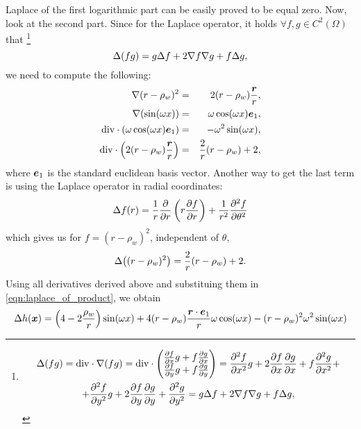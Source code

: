 Laplace of the first logarithmic part can be easily proved to be equal zero. 
Now, look at the second part. Since for the Laplace operator, it holds $\forall f,g\in C^2(\Omega)$ that
\footnote{
\begin{multline} \label{eqn:laplace_of_product_derivation}
  \Delta(fg) = {\rm div}\cdot\nabla(fg) = {\rm div}\cdot\begin{pmatrix} \frac{\partial f}{\partial x} g + f\frac{\partial g}{\partial x} \\ 
      \frac{\partial f}{\partial y} g + f\frac{\partial g}{\partial y}  \end{pmatrix} 
      = \frac{\partial^2 f}{\partial x^2} g + 2\frac{\partial f}{\partial x} \frac{\partial g}{\partial x}
        + f\frac{\partial^2 g}{\partial x^2} + \\
        + \frac{\partial^2 f}{\partial y^2}g + 2\frac{\partial f}{\partial y} \frac{\partial g}{\partial y}
        + \frac{\partial^2 g}{\partial y^2}
        = g\Delta{f} + 2\nabla f\nabla g + f\Delta{g}, \nonumber
\end{multline}
}
\begin{equation} \label{eqn:laplace_of_product}
  \Delta(fg) = g\Delta{f} + 2\nabla f\nabla g + f\Delta{g},
\end{equation}
we need to compute the following:
%
\begin{eqnarray*}
  \nabla (r-\rho_w)^2 &=& 2(r-\rho_w)\frac{\mathbf{\boldsymbol{r}}}{r}, \\
  \nabla (\sin(\omega x)) &=& \omega\cos(\omega x) \mathbf{\boldsymbol{e}}_1, \\
  {\rm div} \cdot\left(\omega\cos(\omega x) \mathbf{\boldsymbol{e}}_1\right) &=& -\omega^2\sin(\omega x),\\
  {\rm div}\cdot\left( 2(r-\rho_w)\frac{\mathbf{\boldsymbol{r}}}{r} \right) &=& \frac{2}{r}(r-\rho_w) + 2,
\end{eqnarray*}
where $\mathbf{\boldsymbol{e}}_1$ is the standard euclidean basis vector.
%
Another way to get the last term is using the Laplace operator in radial coordinates:
\begin{equation} \label{eqn:laplace_radial}
  \Delta f(r) = \frac{1}{r}\frac{\partial}{\partial r}\left( r \frac{\partial f}{\partial r}\right)
    + \frac{1}{r^2}\frac{\partial^2 f}{\partial \theta^2} \nonumber
\end{equation}
which gives us for $f=(r-\rho_w)^2$, independent of $\theta$,
\begin{equation} \label{eqn:laplace_aa}
  \Delta\big((r-\rho_w)^2\big) = \frac{2}{r}(r-\rho_w) + 2. \nonumber
\end{equation}
%
Using all derivatives derived above and substituing them in \eqref{eqn:laplace_of_product}, we obtain
\begin{equation} 
  \Delta h(\mathbf{\boldsymbol{x}}) = \left(4 - 2 \frac{\rho_w}{r} \right) \sin(\omega x)      
                    + 4(r-\rho_w)\frac{\mathbf{\boldsymbol{r}}\cdot\mathbf{\boldsymbol{e}}_1}{r} \omega\cos(\omega x)
                    - (r-\rho_w)^2\omega^2\sin(\omega x)
\end{equation}
%

